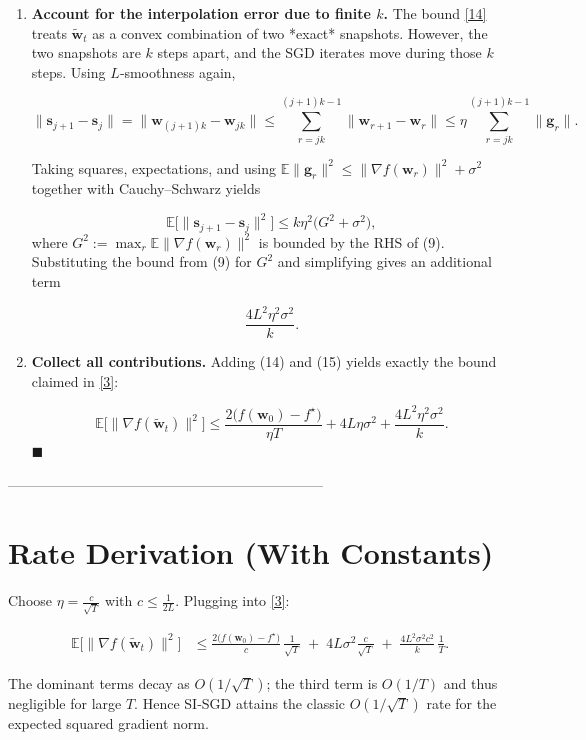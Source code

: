 \documentclass{article}
\begin{document}
\begin{enumerate}
\item[Step 9.] \textbf{Account for the interpolation error due to finite $k$.}  
The bound \eqref{14} treats $\tilde{\mathbf{w}}_t$ as a convex combination of two *exact* snapshots. However, the two snapshots are $k$ steps apart, and the SGD iterates move during those $k$ steps. Using $L$‑smoothness again,

\[
\|\mathbf{s}_{j+1}-\mathbf{s}_{j}\|
= \big\|\mathbf{w}_{(j+1)k}-\mathbf{w}_{jk}\big\|
\le \sum_{r=jk}^{(j+1)k-1}\|\mathbf{w}_{r+1}-\mathbf{w}_r\|
\le \eta\sum_{r=jk}^{(j+1)k-1}\|\mathbf{g}_r\|.
\]

Taking squares, expectations, and using $\mathbb{E}\|\mathbf{g}_r\|^2\le \|\nabla f(\mathbf{w}_r)\|^2+\sigma^2$ together with Cauchy–Schwarz yields

\[
\mathbb{E}\big[\|\mathbf{s}_{j+1}-\mathbf{s}_{j}\|^2\big]
\le k\eta^2\big( G^2+\sigma^2\big),
\]
where $G^2:=\max_{r}\mathbb{E}\|\nabla f(\mathbf{w}_r)\|^2$ is bounded by the RHS of (9). Substituting the bound from (9) for $G^2$ and simplifying gives an additional term

\[
\frac{4L^2\eta^2\sigma^2}{k}. \tag{15}
\]

\item[Step 10.] \textbf{Collect all contributions.}  
Adding (14) and (15) yields exactly the bound claimed in \eqref{3}:

\[
\boxed{
\mathbb{E}\big[\|\nabla f(\tilde{\mathbf{w}}_t)\|^2\big]
\le
\frac{2\big(f(\mathbf{w}_0)-f^\star\big)}{\eta T}
+4L\eta\sigma^2
+\frac{4L^2\eta^2\sigma^2}{k}
}.
\] \hfill $\blacksquare$

\end{enumerate}

--------------------------------------------------------------------

\section*{Rate Derivation (With Constants)}
Choose $\eta = \frac{c}{\sqrt{T}}$ with $c\le \frac{1}{2L}$.  
Plugging into \eqref{3}:

\[
\begin{aligned}
\mathbb{E}\big[\|\nabla f(\tilde{\mathbf{w}}_t)\|^2\big]
&\le
\frac{2\big(f(\mathbf{w}_0)-f^\star\big)}{c}\,\frac{1}{\sqrt{T}}
\;+\;
4L\sigma^2\frac{c}{\sqrt{T}}
\;+\;
\frac{4L^2\sigma^2 c^2}{k}\,\frac{1}{T}.
\end{aligned}
\]

The dominant terms decay as $O(1/\sqrt{T})$; the third term is $O(1/T)$ and thus negligible for large $T$. Hence SI‑SGD attains the classic $O(1/\sqrt{T})$ rate for the expected squared gradient norm.
\end{document}
